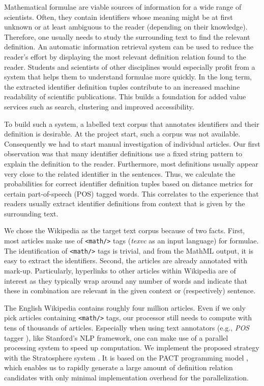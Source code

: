 \documentclass[runningheads]{llncs}
\begin{document}
Mathematical formulae are viable sources of information for a wide range of
scientists. Often, they contain identifiers whose meaning might be at first
unknown or at least ambiguous to the reader (depending on their knowledge).
Therefore, one usually needs to study the surrounding text to find the
relevant definition. An automatic information retrieval system can be used to
reduce the reader's effort by displaying the most relevant definition relation
found to the reader. Students and scientists of other disciplines would
especially profit from a system that helps them to understand formulae more
quickly. In the long term, the extracted identifier definition tuples contribute
to an increased machine readability of scientific publications. This builds a
foundation for added value services such as search, clustering and improved
accessibility.


To build such a system, a labelled text corpus that annotates identifiers and
their definition is desirable. At the project start, such a corpus was not
available. Consequently we had to start manual investigation of individual
articles. Our first observation was that many identifier definitions use a
fixed string pattern to explain the definition to the reader. Furthermore,
most definitions usually appear very close to the related identifier in the
sentences. Thus, we calculate the probabilities for correct identifier
definition tuples based on distance metrics for certain part-of-speech (POS)
tagged words. This correlates to the experience that readers usually extract
identifier definitions from context that is given by the surrounding text.


We chose the Wikipedia as the target text corpus because of two facts. First,
most articles make use of \texttt{<math/>} tags (\emph{texvc} as an input
language) for formulae. The identification of \texttt{<math/>} tags is
trivial, and from the MathML output, it is easy to extract the identifiers.
Second, the articles are already annotated with mark-up. Particularly, hyperlinks
to other articles within Wikipedia are of interest as they typically wrap
around any number of words and indicate that these in combination are relevant
in the given context or (respectively) sentence.


The English Wikipedia contains roughly four million articles. Even if we only
pick articles containing \texttt{<math/>} tags, our processor still needs to
compute with tens of thousands of articles. Especially when using text
annotators (e.g., \emph{POS} tagger \cite{Rathna96}), like Stanford's NLP
framework, one can make use of a parallel processing system to speed up
computation. We implement the proposed strategy with the Stratosphere system
\cite{stratosphere}. It is based on the PACT programming model
\cite{Alexandrov2010}, which enables us to rapidly generate a large amount of
definition relation candidates with only minimal implementation overhead for
the parallelization.
\end{document}
